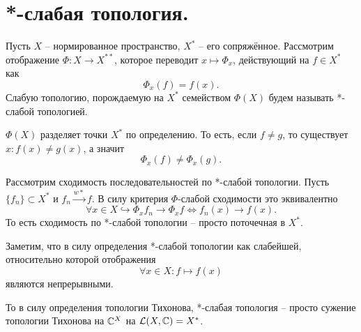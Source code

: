 \section{*-слабая топология.}\label{seq:weak-star-topology}
\begin{definition}
    Пусть $X$ -- нормированное пространство, $X^*$ -- его сопряжённое.
    Рассмотрим отображение $\Phi\colon X \to X^{**}$, которое переводит $x \mapsto \Phi_x$, действующий на $f \in X^*$ как
    \[
        \Phi_x(f) = f(x).
    \]
    Слабую топологию, порождаемую на $X^*$ семейством $\Phi(X)$ будем называть *-слабой топологией.
\end{definition}
\begin{note}
    $\Phi(X)$ разделяет точки $X^*$ по определению.
    То есть, если $f \neq g$, то существует $x\colon f(x) \neq g(x)$, а значит
    \[
        \Phi_x(f) \neq \Phi_x(g).
    \]
\end{note}
\begin{note}
    Рассмотрим сходимость последовательностей по *-слабой топологии.
    Пусть $\{f_n\} \subset X^*$ и $f_n \xrightarrow{w*} f$.
    В силу критерия $\Phi$-слабой сходимости это эквивалентно
    \[
        \forall x \in X \hookrightarrow \Phi_x f_n \rightarrow \Phi_x f \Longleftrightarrow f_n(x) \rightarrow f(x).
    \]
    То есть сходимость по *-слабой топологии -- просто поточечная в $X^*$.
\end{note}
\begin{note}
    Заметим, что в силу определения *-слабой топологии как слабейшей, относительно которой отображения
    \[
        \forall x \in X\colon f \mapsto f(x)
    \]
    являются непрерывными.

    То в силу определения топологии Тихонова, *-слабая топология -- просто сужение топологии Тихонова на $\mathbb{C}^{X}$ на $\mathcal{L}(X, \mathbb{C}) = X^*$.
\end{note}